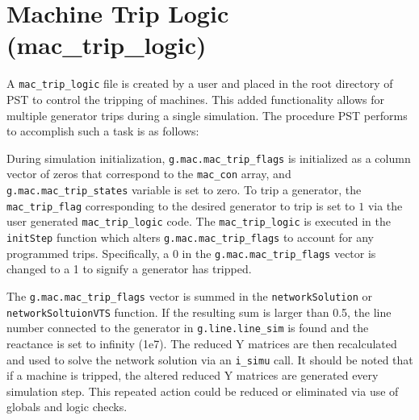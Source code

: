 \section{Machine Trip Logic (mac\_trip\_logic)}  
A \verb|mac_trip_logic| file is created by a user and placed in the root directory of PST to control the tripping of machines.
This added functionality allows for multiple generator trips during a single simulation.
The procedure PST performs to accomplish such a task is as follows:

During simulation initialization, \verb|g.mac.mac_trip_flags| is initialized as a column vector of zeros that correspond to the \verb|mac_con| array, and 
\verb|g.mac.mac_trip_states| variable is set to zero. %
To trip a generator, the \verb|mac_trip_flag| corresponding to the desired generator to trip is set to $1$ via the user generated \verb|mac_trip_logic| code.
The \verb|mac_trip_logic| is executed in the \verb|initStep| function which alters \verb|g.mac.mac_trip_flags| to account for any programmed trips.
Specifically, a $0$ in the \verb|g.mac.mac_trip_flags| vector is changed to a 1 to signify a generator has tripped.


The \verb|g.mac.mac_trip_flags| vector is summed in the \verb|networkSolution| or \\ \verb|networkSoltuionVTS|  function.
If the resulting sum is larger than 0.5, the line number connected to the generator in \verb|g.line.line_sim| is found and the reactance is set to infinity (1e7).
The reduced Y matrices are then recalculated and used to solve the network solution via an \verb|i_simu| call.
It should be noted that if a machine is tripped, the altered reduced Y matrices are generated every simulation step.
This repeated action could be reduced or eliminated via use of globals and logic checks.